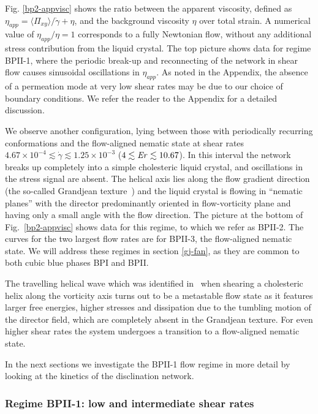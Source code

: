 \documentclass[8.5pt,twoside,twocolumn]{article}
\newcommand{\e}[1]{\times10^{#1}}
\newcommand{\gd}{\dot{\gamma}}
\begin{document}
Fig. \ref{bp2-appvisc} shows the ratio between the apparent viscosity, 
defined as $\eta_{app}=\langle \Pi_{xy} \rangle/\gd +\eta$, and the background viscosity $\eta$ 
over total strain.
A numerical value of $\eta_{app}/\eta=1$ corresponds to a fully Newtonian flow,
without any additional stress contribution from the liquid crystal.
The top picture shows data for regime BPII-1, where the periodic break-up and reconnecting of the network 
in shear flow causes sinusoidal oscillations in $\eta_{app}$. As noted in the Appendix, the
absence of a permeation mode at very low shear rates may be due to our
choice of boundary conditions. We refer the reader to the Appendix for a detailed discussion.

We observe another configuration, lying between those with periodically recurring conformations 
and the flow-aligned nematic state at shear rates $4.67\e{-4}\lesssim\gd\lesssim1.25\e{-3}$ ($4 \lesssim {\it Er} \lesssim 10.67$). 
In this interval the network breaks up completely into a simple cholesteric liquid crystal, and oscillations in the stress signal are absent.
The helical axis lies along the flow gradient direction (the so-called Grandjean texture~\cite{deGennes})
and the liquid crystal is flowing in ``nematic planes'' with the director predominantly oriented in flow-vorticity plane and having only
a small angle with the flow direction.
The picture at the bottom of Fig.~\ref{bp2-appvisc} shows data for this regime, to which we refer as BPII-2. The 
curves for the two largest flow rates are for BPII-3, the flow-aligned nematic state. 
We will address these regimes in section \ref{gj-fan}, as they are common to both cubic blue phases BPI and BPII.

The travelling helical wave which was identified in~\cite{Rey:1996a,Rey:1996b} when shearing a cholesteric helix along
the vorticity axis turns out to be a metastable flow state as it features larger free energies, higher stresses and dissipation due 
to the tumbling motion of the director field, which are completely absent in the Grandjean texture.
For even higher shear rates the system undergoes a transition to a flow-aligned nematic state.

In the next sections we investigate the BPII-1 flow regime in more detail 
by looking at the kinetics of the disclination network.


\subsubsection{Regime BPII-1: low and intermediate shear rates }
\end{document}
